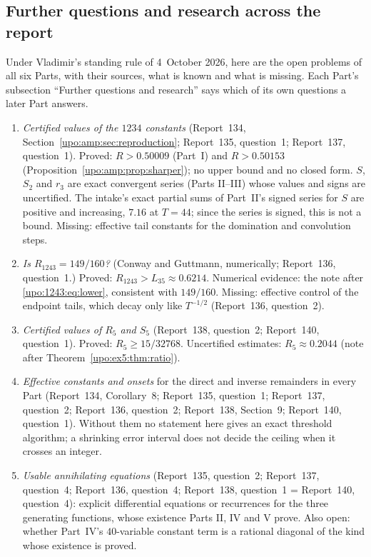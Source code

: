 \documentclass[11pt,letterpaper]{article}
\theoremstyle{remark}\newtheorem{remark}[theorem]{Remark}
\numberwithin{equation}{section}
\begin{document}
\subsection{Further questions and research across the report}\label{upo:sec:further}
Under Vladimir's standing rule of 4~October 2026, here are the open problems of all six Parts, with their sources, what is known and what is missing. Each Part's subsection ``Further questions and research'' says which of its own questions a later Part answers.
\begin{enumerate}[label=\arabic*.,ref=\arabic*]
\item \emph{Certified values of the $1234$ constants} (Report~134, Section~\ref{upo:amp:sec:reproduction}; Report~135, question~1; Report~137, question~1). Proved: $R>0.50009$ (Part~I) and $R>0.50153$ (Proposition~\ref{upo:amp:prop:sharper}); no upper bound and no closed form. $S$, $S_2$ and $r_3$ are exact convergent series (Parts II--III) whose values and signs are uncertified. The intake's exact partial sums of Part~II's signed series for $S$ are positive and increasing, $7.16$ at $T=44$; since the series is signed, this is not a bound. Missing: effective tail constants for the domination and convolution steps.
\item \emph{Is $R_{1243}=149/160$?} (Conway and Guttmann, numerically; Report~136, question~1.) Proved: $R_{1243}>L_{35}\approx0.6214$. Numerical evidence: the note after \eqref{upo:1243:eq:lower}, consistent with $149/160$. Missing: effective control of the endpoint tails, which decay only like $T^{-1/2}$ (Report~136, question~2).
\item \emph{Certified values of $R_5$ and $S_5$} (Report~138, question~2; Report~140, question~1). Proved: $R_5\ge15/32768$. Uncertified estimates: $R_5\approx0.2044$ (note after Theorem~\ref{upo:ex5:thm:ratio}).
\item \emph{Effective constants and onsets} for the direct and inverse remainders in every Part (Report~134, Corollary~8; Report~135, question~1; Report~137, question~2; Report~136, question~2; Report~138, Section~9; Report~140, question~1). Without them no statement here gives an exact threshold algorithm; a shrinking error interval does not decide the ceiling when it crosses an integer.
\item \emph{Usable annihilating equations} (Report~135, question~2; Report~137, question~4; Report~136, question~4; Report~138, question~1 = Report~140, question~4): explicit differential equations or recurrences for the three generating functions, whose existence Parts II, IV and V prove. Also open: whether Part~IV's $40$-variable constant term is a rational diagonal of the kind whose existence is proved.

\end{enumerate}
\end{document}
